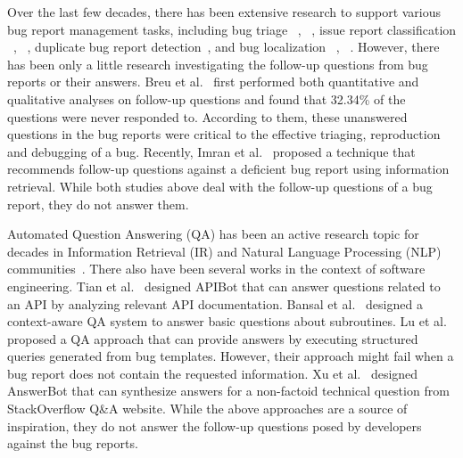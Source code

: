 Over the last few decades, there has been extensive research to support various bug report management tasks, including bug triage ~\cite{zhao2019unified}, ~\cite{bodden2017proceedings}, issue report classification ~\cite{thung2012automatic}, ~\cite{nayrolles2018towards}, duplicate bug report detection~\cite{nguyen2012duplicate, chaparro2019reformulating}, and bug localization ~\cite{zhang2019finelocator}, ~\cite{xiao2019improving}. However, there has been only a little research investigating the follow-up questions from bug reports or their answers. Breu et al.~\cite{breu2010information} first performed both quantitative and qualitative analyses on follow-up questions and found that 32.34\% of the questions were never responded to. According to them, these unanswered questions in the bug reports were critical to the effective triaging, reproduction and debugging of a bug. Recently, Imran et al.~\cite{imran2021automatically} proposed a technique that recommends follow-up questions against a deficient bug report using information retrieval. While both studies above deal with the follow-up questions of a bug report, they do not answer them.\par



Automated Question Answering (QA) has been an active research topic for decades in Information Retrieval (IR) and Natural Language Processing (NLP) communities~\cite{ravichandran2002learning,brill2002analysis,waltz1978english, iyyer2014neural,asaduzzaman2013answering, tian2017apibot, lu2021beat, bansal2021neural, xu2017answerbot, abdellatif2020msrbot}. There also have been several works in the context of software engineering. Tian et al.~\cite{tian2017apibot} designed APIBot that can answer questions related to an API by analyzing relevant API documentation. Bansal et al.~\cite{bansal2021neural} designed a context-aware QA system to answer basic questions about subroutines. Lu et al.~\cite{lu2021beat} proposed a QA approach that can provide answers by executing structured queries generated from bug templates. However, their approach might fail when a bug report does not contain the requested information. Xu et al.~\cite{xu2017answerbot} designed AnswerBot that can synthesize answers for a non-factoid technical question from StackOverflow Q\&A website. While the above approaches are a source of inspiration, they do not answer the follow-up questions posed by developers against the bug reports.\par




